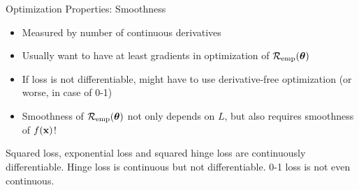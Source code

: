 \documentclass[11pt,compress,t,notes=noshow, xcolor=table]{beamer}
\begin{document}
\begin{frame}{Optimization Properties: Smoothness}


\begin{itemize}
\item Measured by number of continuous derivatives
\item Usually want to have at least gradients in optimization of $\mathcal{R}_{\text{emp}}(\bm{\theta})$
\item If loss is not differentiable, might have to use derivative-free optimization (or worse, in case of 0-1)
\item Smoothness of $\mathcal{R}_{\text{emp}}(\bm{\theta})$ not only depends on $L$, but also requires smoothness of $f(\mathbf{x})$! 
\end{itemize}

\vfill

%
{
  \raggedright {\footnotesize
  Squared loss, exponential loss and squared hinge loss are continuously 
  differentiable. Hinge loss is continuous but not differentiable. 
  0-1 loss is not even continuous.}
}%






\end{frame}
\end{document}
